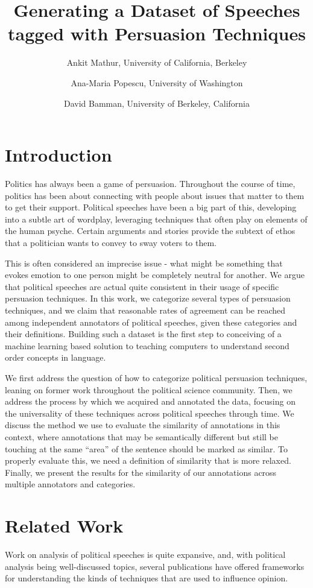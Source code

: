 \documentclass[letterpaper]{article}
\title{Generating a Dataset of Speeches tagged with Persuasion Techniques}
\author{Ankit Mathur, University of California, Berkeley \and Ana-Maria Popescu, University of Washington \and David Bamman, University of Berkeley, California}
\begin{document}
\maketitle
\section{Introduction}
Politics has always been a game of persuasion. Throughout the course of time, politics has been about connecting with people about issues that matter to them to get their support. Political speeches have been a big part of this, developing into a subtle art of wordplay, leveraging techniques that often play on elements of the human psyche. Certain arguments and stories provide the subtext of ethos that a politician wants to convey to sway voters to them.

This is often considered an imprecise issue - what might be something that evokes emotion to one person might be completely neutral for another. We argue that political speeches are actual quite consistent in their usage of specific persuasion techniques. In this work, we categorize several types of persuasion techniques, and we claim that reasonable rates of agreement can be reached among independent annotators of political speeches, given these categories and their definitions. Building such a dataset is the first step to conceiving of a machine learning based solution to teaching computers to understand second order concepts in language. 

We first address the question of how to categorize political persuasion techniques, leaning on former work throughout the political science community. Then, we address the process by which we acquired and annotated the data, focusing on the universality of these techniques across political speeches through time. We discuss the method we use to evaluate the similarity of annotations in this context, where annotations that may be semantically different but still be touching at the same ``area'' of the sentence should be marked as similar. To properly evaluate this, we need a definition of similarity that is more relaxed. Finally, we present the results for the similarity of our annotations across multiple annotators and categories.
\section{Related Work}
Work on analysis of political speeches is quite expansive, and, with political analysis being well-discussed topics, several publications have offered frameworks for understanding the kinds of techniques that are used to influence opinion. 
\end{document}
